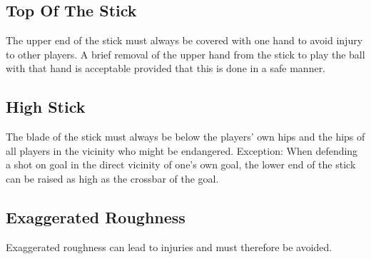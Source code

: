 \subsection{Top Of The Stick}
The upper end of the stick must always be covered with one hand to avoid injury to other players.
A brief removal of the upper hand from the stick to play the ball with that hand is acceptable provided that this is done in a safe manner.

\subsection{High Stick \label{subsec:hockey_safety_stick}}
The blade of the stick must always be below the players' own hips and the hips of all players in the vicinity who might be endangered.
Exception: When defending a shot on goal in the direct vicinity of one's own goal, the lower end of the stick can be raised as high as the crossbar of the goal.

\subsection{Exaggerated Roughness}
Exaggerated roughness can lead to injuries and must therefore be avoided.
